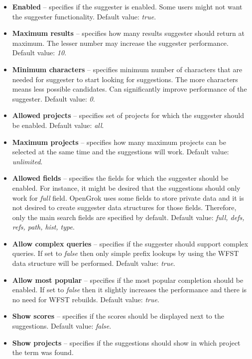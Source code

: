 \begin{itemize}
    \item \textbf{Enabled} – specifies if the suggester is enabled. Some users might not want the suggester functionality.
    Default value: \textit{true}.
    \item \textbf{Maximum results} – specifies how many results suggester should return at maximum. The lesser number may
    increase the suggester performance. Default value: \textit{10}.
    \item \textbf{Minimum characters} – specifies minimum number of characters that are needed for suggester to start looking
    for suggestions. The more characters means less possible candidates. Can significantly improve performance of the
    suggester. Default value: \textit{0}.
    \item \textbf{Allowed projects} – specifies set of projects for which the suggester should be enabled. Default value: \textit{all}.
    \item \textbf{Maximum projects} – specifies how many maximum projects can be selected at the same time and the suggestions will work.
    Default value: \textit{unlimited}.
    \item \textbf{Allowed fields} – specifies the fields for which the suggester should be enabled. For instance, it might be
    desired that the suggestions should only work for \textit{full} field. OpenGrok uses some fields to store
    private data and it is not desired to create suggester data structures for those fields. Therefore, only the main
    search fields are specified by default.
    Default value: \textit{full, defs, refs, path, hist, type}.
    \item \textbf{Allow complex queries} – specifies if the suggester should support complex queries. If set to
    \textit{false} then only simple prefix lookups by using the WFST data structure will be performed. Default value:
    \textit{true}.
    \item \textbf{Allow most popular} – specifies if the most popular completion should be enabled.
    If set to \textit{false} then it slightly increases the performance and there is no need for WFST rebuilds. Default value: \textit{true}.
    \item \textbf{Show scores} – specifies if the scores should be displayed next to the suggestions.
    Default value: \textit{false}.
    \item \textbf{Show projects} – specifies if the suggestions should show in which project the term was found.

\end{itemize}
